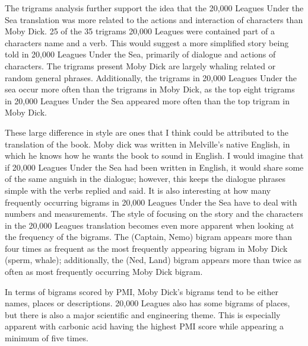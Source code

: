 \documentclass[11pt]{article}
\begin{document}
The trigrams analysis further support the idea that the 20,000 Leagues
Under the Sea translation was more related to the actions and
interaction of characters than Moby Dick. 25 of the 35 trigrams 20,000
Leagues were contained part of a characters name and a verb. This would
suggest a more simplified story being told in 20,000 Leagues Under the
Sea, primarily of dialogue and actions of characters. The trigrams
present Moby Dick are largely whaling related or random general phrases.
Additionally, the trigrams in 20,000 Leagues Under the sea occur more
often than the trigrams in Moby Dick, as the top eight trigrams in
20,000 Leagues Under the Sea appeared more often than the top trigram in
Moby Dick.

These large difference in style are ones that I think could be
attributed to the translation of the book. Moby dick was written in
Melville's native English, in which he knows how he wants the book to
sound in English. I would imagine that if 20,000 Leagues Under the Sea
had been written in English, it would share some of the same anguish in
the dialogue; however, this keeps the dialogue phrases simple with the
verbs replied and said. It is also interesting at how many frequently
occurring bigrams in 20,000 Leagues Under the Sea have to deal with
numbers and measurements. The style of focusing on the story and the
characters in the 20,000 Leagues translation becomes even more apparent
when looking at the frequency of the bigrams. The (Captain, Nemo) bigram
appears more than four times as frequent as the most frequently
appearing bigram in Moby Dick (sperm, whale); additionally, the (Ned,
Land) bigram appears more than twice as often as most frequently
occurring Moby Dick bigram.

In terms of bigrams scored by PMI, Moby Dick's bigrams tend to be either
names, places or descriptions. 20,000 Leagues also has some bigrams of
places, but there is also a major scientific and engineering theme. This
is especially apparent with carbonic acid having the highest PMI score
while appearing a minimum of five times.
\end{document}
